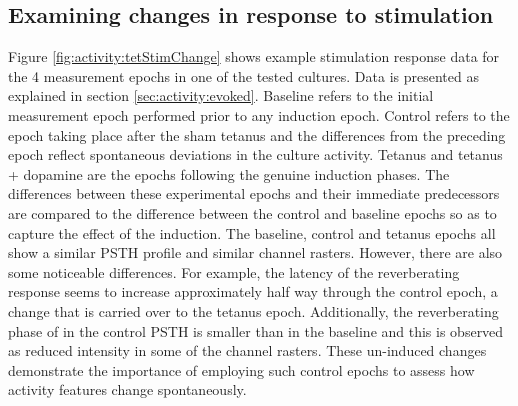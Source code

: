     \subsection{Examining changes in response to stimulation}
    Figure \ref{fig:activity:tetStimChange} shows example stimulation response data for the 4 measurement epochs in one of the tested cultures. Data is presented as explained in section \ref{sec:activity:evoked}. Baseline refers to the initial measurement epoch performed prior to any induction epoch. Control refers to the epoch taking place after the sham tetanus and the differences from the preceding epoch reflect spontaneous deviations in the culture activity. Tetanus and tetanus + dopamine are the epochs following the genuine induction phases. The differences between these experimental epochs and their immediate predecessors are compared to the difference between the control and baseline epochs so as to capture the effect of the induction. The baseline, control and tetanus epochs all show a similar PSTH profile and similar channel rasters. However, there are also some noticeable differences. For example, the latency of the reverberating response seems to increase approximately half way through the control epoch, a change that is carried over to the tetanus epoch. Additionally, the reverberating phase of in the control PSTH is smaller than in the baseline and this is observed as reduced intensity in some of the channel rasters. These un-induced changes demonstrate the importance of employing such control epochs to assess how activity features change spontaneously.

